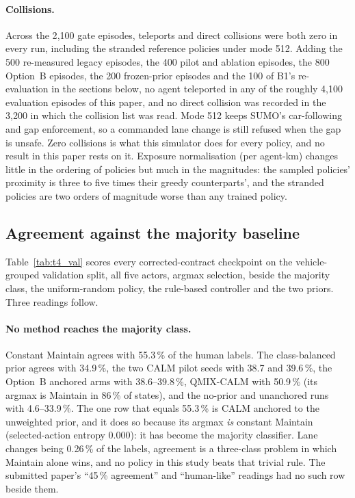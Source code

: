 \paragraph{Collisions.}
Across the 2{,}100 gate episodes, teleports and direct collisions were both zero in every run, including the stranded reference policies under mode 512. Adding the 500 re-measured legacy episodes, the 400 pilot and ablation episodes, the 800 Option~B episodes, the 200 frozen-prior episodes and the 100 of B1's re-evaluation in the sections below, no agent teleported in any of the roughly 4{,}100 evaluation episodes of this paper, and no direct collision was recorded in the 3{,}200 in which the collision list was read. Mode 512 keeps SUMO's car-following and gap enforcement, so a commanded lane change is still refused when the gap is unsafe. Zero collisions is what this simulator does for every policy, and no result in this paper rests on it. Exposure normalisation (per agent-km) changes little in the ordering of policies but much in the magnitudes: the sampled policies' proximity is three to five times their greedy counterparts', and the stranded policies are two orders of magnitude worse than any trained policy.




\subsection{Agreement against the majority baseline}
\label{sec:agreement}

Table~\ref{tab:t4_val} scores every corrected-contract checkpoint on the vehicle-grouped validation split, all five actors, argmax selection, beside the majority class, the uniform-random policy, the rule-based controller and the two priors. Three readings follow.

\paragraph{No method reaches the majority class.}
Constant Maintain agrees with 55.3\,\% of the human labels. The class-balanced prior agrees with 34.9\,\%, the two CALM pilot seeds with 38.7 and 39.6\,\%, the Option~B anchored arms with 38.6--39.8\,\%, QMIX-CALM with 50.9\,\% (its argmax is Maintain in 86\,\% of states), and the no-prior and unanchored runs with 4.6--33.9\,\%. The one row that equals 55.3\,\% is CALM anchored to the unweighted prior, and it does so because its argmax \emph{is} constant Maintain (selected-action entropy 0.000): it has become the majority classifier. Lane changes being 0.26\,\% of the labels, agreement is a three-class problem in which Maintain alone wins, and no policy in this study beats that trivial rule. The submitted paper's ``45\,\% agreement'' and ``human-like'' readings had no such row beside them.

